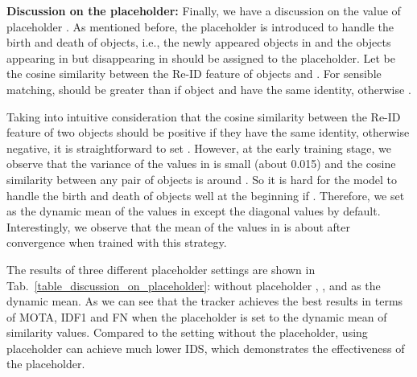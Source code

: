 \documentclass[final,1p,times,twocolumn]{elsarticle}
\newcommand{\tref}[1]{Tab.~\ref{#1}}
\begin{document}
	
	\textbf{Discussion on the placeholder:}
	Finally, we have a discussion on the value of placeholder . As mentioned before, the placeholder  is introduced to handle the birth and death of objects, i.e., the newly appeared objects in  and the objects appearing in  but disappearing in  should be assigned to the placeholder. Let  be the cosine similarity between the Re-ID feature of objects  and . For sensible matching,  should be greater than  if object  and  have the same identity, otherwise . 
	
	Taking into intuitive consideration that the cosine similarity between the Re-ID feature of two objects should be positive if they have the same identity, otherwise negative, it is straightforward to set . However, at the early training stage, we observe that the variance of the values in  is small (about 0.015) and the cosine similarity between any pair of objects is around . So it is hard for the model to handle the birth and death of objects well at the beginning if . Therefore, we set  as the dynamic mean of the values in  except the diagonal values by default. Interestingly, we observe that the mean of the values in  is about  after convergence  when trained with this strategy. 
	
	

	
	The results of three different placeholder settings are shown in \tref{table_discussion_on_placeholder}: without placeholder , , and  as the dynamic mean. As we can see that the tracker achieves the best results in terms of MOTA, IDF1 and FN when the placeholder is set to the dynamic mean of similarity values. Compared to the setting without the placeholder, using placeholder can achieve much lower IDS, which demonstrates the effectiveness of the placeholder.
\end{document}

